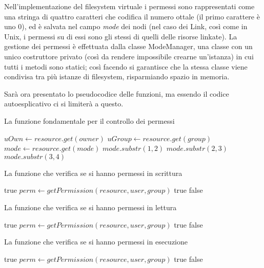  Nell'implementazione del filesystem virtuale i permessi sono rappresentati come una stringa di quattro caratteri che codifica il numero ottale (il primo carattere è uno 0), ed è salvata nel campo \emph{mode} dei nodi (nel caso dei Link, così come in Unix, i permessi su di essi sono gli stessi di quelli delle risorse linkate). La gestione dei permessi è effettuata dalla classe ModeManager, una classe con un unico costruttore privato (così da rendere impossibile crearne un'istanza) in cui tutti i metodi sono statici; così facendo si garantisce che la stessa classe viene condivisa tra più istanze di filesystem, risparmiando spazio in memoria.
 
 Sarà ora presentato lo pseudocodice delle funzioni, ma essendo il codice autoesplicativo ci si limiterà a questo.   
\begin{algorithm}
\caption{La funzione fondamentale per il controllo dei permessi}
\begin{algorithmic}[5]
\State $uOwn\gets resource.get(owner)$
\State $uGroup\gets resource.get(group)$
\State $mode\gets resource.get(mode)$
	\State \Return $mode.substr(1,2)$
	\State \Return $mode.substr(2,3)$
\Else
	\State \Return $mode.substr(3,4)$
\EndIf
\EndFunction
\end{algorithmic}
\end{algorithm}
\begin{algorithm}
\caption{La funzione che verifica se si hanno permessi in scrittura}
\begin{algorithmic}[5]
	\State \Return true
\EndIf
\State $perm \gets getPermission(resource, user, group)$
	\State \Return true
\EndIf
\State \Return false
\EndFunction
\end{algorithmic}
\end{algorithm}
\begin{algorithm}
\caption{La funzione che verifica se si hanno permessi in lettura}
\begin{algorithmic}[5]
	\State \Return true
\EndIf
\State $perm \gets getPermission(resource, user, group)$
	\State \Return true
\EndIf
\State \Return false
\EndFunction
\end{algorithmic}
\end{algorithm}
   \begin{algorithm}
\caption{La funzione che verifica se si hanno permessi in esecuzione}
\begin{algorithmic}[5]
	\State \Return true
\EndIf
\State $perm \gets getPermission(resource, user, group)$
	\State \Return true
\EndIf
\State \Return false
\EndFunction
\end{algorithmic}
\end{algorithm}
